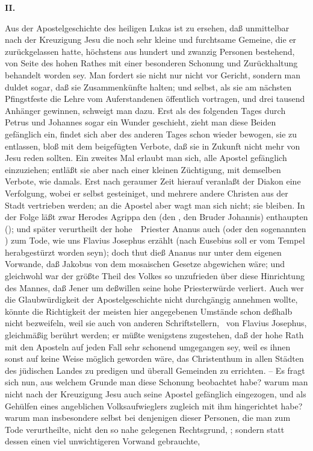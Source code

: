 \vabst \textbf{II.}~\par
Aus der Apostelgeschichte des heiligen Lukas ist zu ersehen, daß unmittelbar nach der Kreuzigung Jesu die noch sehr kleine und furchtsame Gemeine, die er zurückgelassen hatte, höchstens aus hundert und zwanzig Personen bestehend, von Seite des hohen Rathes mit einer besonderen Schonung und Zurückhaltung behandelt worden sey. Man fordert sie nicht nur nicht vor Gericht, sondern man duldet sogar, daß sie Zusammenkünfte halten; und selbst, als sie am nächsten Pfingstfeste die Lehre vom Auferstandenen öffentlich vortragen, und drei tausend Anhänger gewinnen, schweigt man dazu. Erst als des folgenden Tages durch Petrus und Johannes sogar ein Wunder geschieht, zieht man diese Beiden gefänglich ein, findet sich aber des anderen Tages schon wieder bewogen, sie zu entlassen, bloß mit dem beigefügten Verbote, daß sie in Zukunft nicht mehr von Jesu reden sollten. Ein zweites Mal erlaubt man sich, alle Apostel gefänglich einzuziehen; entläßt sie aber nach einer kleinen Züchtigung, mit demselben Verbote, wie damals. Erst nach geraumer Zeit hierauf veranlaßt der Diakon  eine Verfolgung, wobei er selbst gesteiniget, und mehrere andere Christen aus der Stadt vertrieben werden; an die Apostel aber wagt man sich nicht; sie bleiben. In der Folge läßt zwar Herodes Agrippa den  (den , den Bruder Johannis) enthaupten (); und später verurtheilt der hohe~\ Priester Ananus auch  (oder den sogenannten ) zum Tode, wie uns Flavius Josephus erzählt (nach Eusebius  soll er vom Tempel herabgestürzt worden seyn); doch thut dieß Ananus nur unter dem eigenen Vorwande, daß Jakobus von dem mosaischen Gesetze abgewichen wäre; und gleichwohl war der größte Theil des Volkes so unzufrieden über diese Hinrichtung des Mannes, daß Jener um deßwillen seine hohe Priesterwürde verliert. Auch wer die Glaubwürdigkeit der Apostelgeschichte nicht durchgängig annehmen wollte, könnte die Richtigkeit der meisten hier angegebenen Umstände schon deßhalb nicht bezweifeln, weil sie auch von anderen Schriftstellern, \zB\ von Flavius Josephus, gleichmäßig berührt werden; er müßte wenigstens zugestehen, daß der hohe Rath mit den Aposteln auf jeden Fall sehr schonend umgegangen sey, weil es ihnen sonst auf keine Weise möglich geworden wäre, das Christenthum in allen Städten des jüdischen Landes zu predigen und überall Gemeinden zu errichten. -- Es fragt sich nun, aus welchem Grunde man diese Schonung beobachtet habe? warum man nicht nach der Kreuzigung Jesu auch seine Apostel gefänglich eingezogen, und als Gehülfen eines angeblichen Volksaufwieglers zugleich mit ihm hingerichtet habe? warum man insbesondere selbst bei denjenigen dieser Personen, die man zum Tode verurtheilte, nicht den so nahe gelegenen Rechtsgrund, ; sondern statt dessen einen viel unwichtigeren Vorwand gebrauchte, 